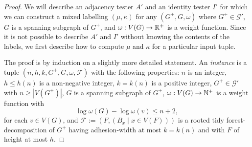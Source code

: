 \documentclass{patmorin}
\renewcommand{\le}{\leqslant}
\renewcommand{\geq}{\geqslant}
\newcommand{\defin}[1]{\emph{\textcolor{brightmaroon}{#1}}}
\newcommand{\calF}{\mathcal{F}}
\newcommand{\calG}{\mathcal{G}}
\begin{document}
\begin{proof}
  We will describe an adjacency tester $A'$ and an identity tester $I'$ for which we can construct a mixed labelling $(\mu,\kappa)$ for any $(G^+,G,\omega)$ where $G^+\in\calG'$, $G$ is a spanning subgraph of $G^+$, and $\omega:V(G)\to\mathbb{R}^+$ is a weight function.
  Since it is not possible to describe $A'$ and $I'$ without knowing the contents of the labels, we first describe how to compute $\mu$ and $\kappa$ for a particular input tuple.

  The proof is by induction on a slightly more detailed statement. An \defin{instance} is a tuple $(n,h,k,G^+,G,\omega,\calF)$ with the following properties:
  $n$ is an integer,
  $h\le h(n)$ is a non-negative integer,
  $k=k(n)$ is a positive integer,
  $G^+\in\calG'$ with $n\geq |V(G^+)|$,
  $G$ is a spanning subgraph of $G^+$,
  $\omega:V(G)\to\mathbb{N}^+$
  is a weight function with
  \begin{equation}
    \log\omega(G)-\log \omega(v)\le n+2,
    \label{eq:short-td-nice-weights}
  \end{equation}
  for each $v\in V(G)$, and
  $\calF:=(F,(B_x \mid x\in V(F)))$ is a rooted tidy forest-decomposition of $G^+$ having adhesion-width at most $k=k(n)$ and with $F$ of height at most $h$.


\end{proof}
\end{document}
